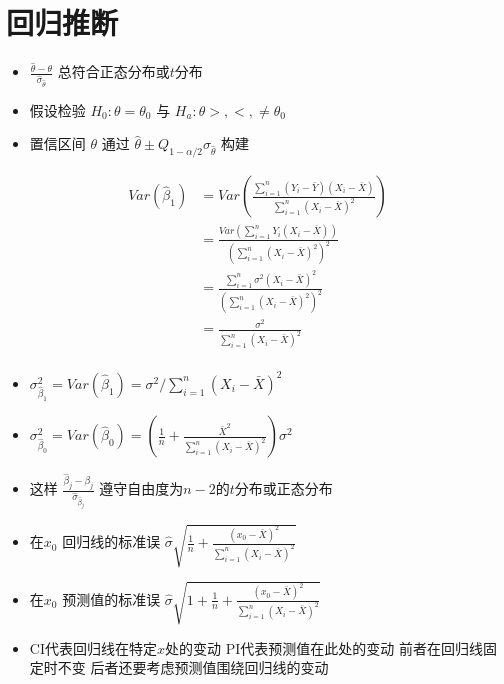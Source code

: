 \documentclass[
]{book}
\providecommand{\tightlist}{%
  \setlength{\itemsep}{0pt}\setlength{\parskip}{0pt}}
\begin{document}
\hypertarget{ux56deux5f52ux63a8ux65ad}{%
\section{回归推断}\label{ux56deux5f52ux63a8ux65ad}}

\begin{itemize}
\tightlist
\item
  \(\frac{\hat \theta - \theta}{\hat \sigma_{\hat \theta}}\) 总符合正态分布或\(t\)分布
\item
  假设检验 \(H_0 : \theta = \theta_0\) 与 \(H_a : \theta >, <, \neq \theta_0\)
\item
  置信区间 \(\theta\) 通过 \(\hat \theta \pm Q_{1-\alpha/2} \hat \sigma_{\hat \theta}\) 构建
\end{itemize}

\begin{align}
Var(\hat \beta_1) & =
Var\left(\frac{\sum_{i=1}^n (Y_i - \bar Y) (X_i - \bar X)}{\sum_{i=1}^n (X_i - \bar X)^2}\right) \\
& = \frac{Var\left(\sum_{i=1}^n Y_i (X_i - \bar X) \right) }{\left(\sum_{i=1}^n (X_i - \bar X)^2 \right)^2} \\
& = \frac{\sum_{i=1}^n \sigma^2(X_i - \bar X)^2}{\left(\sum_{i=1}^n (X_i - \bar X)^2 \right)^2} \\
& = \frac{\sigma^2}{\sum_{i=1}^n (X_i - \bar X)^2} \\
\end{align}

\begin{itemize}
\tightlist
\item
  \(\sigma_{\hat \beta_1}^2 = Var(\hat \beta_1) = \sigma^2 / \sum_{i=1}^n (X_i - \bar X)^2\)
\item
  \(\sigma_{\hat \beta_0}^2 = Var(\hat \beta_0) = \left(\frac{1}{n} + \frac{\bar X^2}{\sum_{i=1}^n (X_i - \bar X)^2 }\right)\sigma^2\)
\item
  这样 \(\frac{\hat \beta_j - \beta_j}{\hat \sigma_{\hat \beta_j}}\) 遵守自由度为\(n-2\)的\(t\)分布或正态分布
\item
  在\(x_0\) 回归线的标准误 \(\hat \sigma\sqrt{\frac{1}{n} + \frac{(x_0 - \bar X)^2}{\sum_{i=1}^n (X_i - \bar X)^2}}\)
\item
  在\(x_0\) 预测值的标准误 \(\hat \sigma\sqrt{1 + \frac{1}{n} + \frac{(x_0 - \bar X)^2}{\sum_{i=1}^n (X_i - \bar X)^2}}\)
\item
  CI代表回归线在特定\(x\)处的变动 PI代表预测值在此处的变动 前者在回归线固定时不变 后者还要考虑预测值围绕回归线的变动
\end{itemize}
\end{document}
